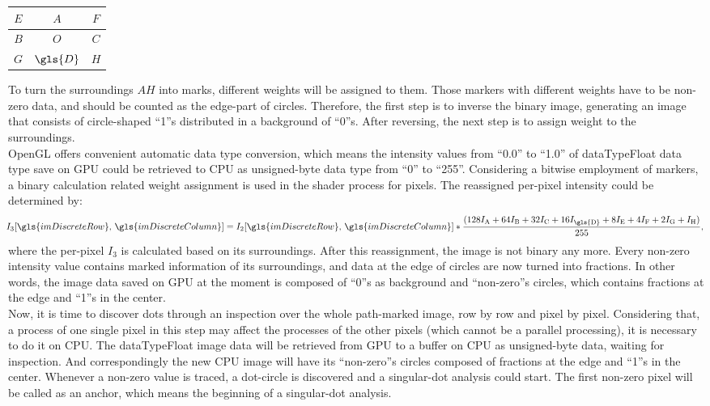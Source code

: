 \begin{center}
  \begin{tabular}{ | c | c | c | }
    \hline
    \(E\) & \(A\) & \(F\) \\ \hline
    \(B\) & \(O\) & \(C\) \\ \hline
    \(G\) & \(\gls{D}\) & \(H\) \\
    \hline
  \end{tabular}
\end{center}
%
To turn the surroundings \(A\)\texttildelow \(H\) into marks, different weights will be assigned to them. Those markers with different weights have to be non-zero data, and should be counted as the edge-part of circles. Therefore, the first step is to inverse the binary image, generating an image that consists of circle-shaped \enquote{1}s distributed in a background of \enquote{0}s. After reversing, the next step is to assign weight to the surroundings. %
\\\indent
OpenGL offers convenient automatic data type conversion, which means the intensity values from \enquote{0.0} to \enquote{1.0} of \gls{dataTypeFloat} data type save on \gls{GPU} could be retrieved to CPU as unsigned-byte data type from \enquote{0} to \enquote{255}. Considering a bitwise employment of markers, a binary calculation related weight assignment is used in the shader process for pixels. The reassigned per-pixel intensity could be determined by:
%
\begin{equation}
\hspace*{-0.1cm}%
%
I_3  [\gls{imDiscreteRow}, \, \gls{imDiscreteColumn}] = I_2  [\gls{imDiscreteRow}, \, \gls{imDiscreteColumn}] * \frac{(128I_{\text{A}} + 64I_{\text{B}} + 32I_{\text{C}} + 16I_{\text{\gls{D}}} + 8I_{\text{E}} +  4I_{\text{F}} +  2I_{\text{G}}+I_{\text{H}})}{ 255 } ,
%
\label{snifferDistributionWeight}
\end{equation}%
\noindent%
where the per-pixel \(I_3\) is calculated based on its surroundings. After this reassignment, the image is not binary any more. Every non-zero intensity value contains marked information of its surroundings, and data at the edge of circles are now turned into fractions. In other words, the image data saved on \gls{GPU} at the moment is composed of \enquote{0}s as background and \enquote{non-zero}s circles, which contains fractions at the edge and \enquote{1}s in the center. %
\\\indent%
Now, it is time to discover dots through an inspection over the whole path-marked image, row by row and pixel by pixel. Considering that, a process of one single pixel in this step may affect the processes of the other pixels (which cannot be a parallel processing), it is necessary to do it on CPU. The \gls{dataTypeFloat} image data will be retrieved from \gls{GPU} to a buffer on CPU as unsigned-byte data, waiting for inspection. And correspondingly the new CPU image will have its \enquote{non-zero}s circles composed of fractions at the edge and \enquote{1}s in the center. Whenever a non-zero value is traced, a dot-circle is discovered and a singular-dot analysis could start. The first non-zero pixel will be called as an anchor, which means the beginning of a singular-dot analysis. %
